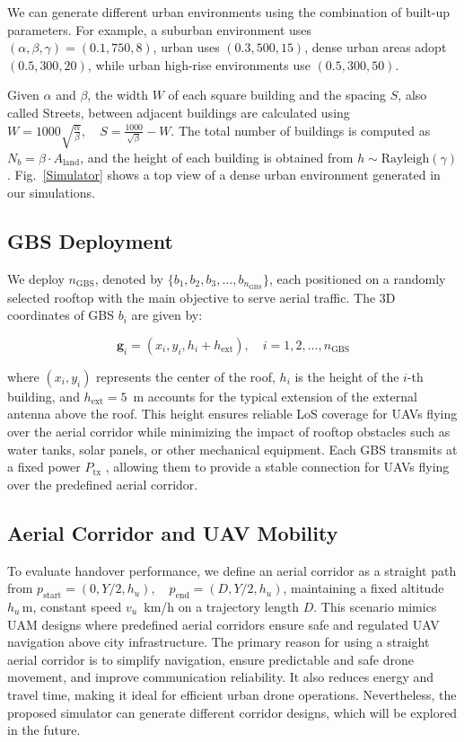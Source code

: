 \documentclass[10pt,conference]{IEEEtran}
\begin{document}
We can generate different urban environments using the combination of built-up parameters. For example, a suburban environment uses $(\alpha, \beta, \gamma) = (0.1, 750, 8)$, urban uses $(0.3, 500, 15)$, dense urban areas adopt $(0.5, 300, 20)$, while urban high-rise environments use $(0.5, 300, 50)$.

Given $\alpha$ and $\beta$, the width $W$ of each square building and the spacing $S$, also called Streets, between adjacent buildings are calculated using $W = 1000 \sqrt{\frac{\alpha}{\beta}}, \quad S = \frac{1000}{\sqrt{\beta}} - W$. The total number of buildings is computed as $N_b = \beta \cdot A_{\text{land}}$, and the height of each building is obtained from $h \sim \text{Rayleigh}(\gamma)$. Fig.~\ref{Simulator} shows a top view of a dense urban environment generated in our simulations.


\subsection{GBS Deployment}

We deploy $n_{\text{GBS}}$, denoted by $\{b_1, b_2, b_3, \dots, b_{n_{\text{GBS}}}\}$, each positioned on a randomly selected rooftop with the main objective to serve aerial traffic. The 3D coordinates of GBS $b_i$ are given by:

\begin{equation}
\mathbf{g}_i = (x_i, y_i, h_i + h_{\text{ext}}), \quad i = 1, 2, \dots, n_{\text{GBS}}
\end{equation}

where $(x_i, y_i)$ represents the center of the roof, $h_i$ is the height of the $i$-th building, and $h_{\text{ext}} = 5$~m accounts for the typical extension of the external antenna above the roof. This height ensures reliable LoS coverage for UAVs flying over the aerial corridor while minimizing the impact of rooftop obstacles such as water tanks, solar panels, or other mechanical equipment. Each GBS transmits at a fixed power $P_{\mathrm{tx}}$%
, allowing them to provide a stable connection for UAVs flying over the predefined aerial corridor.

\subsection{Aerial Corridor and UAV Mobility}

To evaluate handover performance, we define an aerial corridor as a straight path from $p_{\text{start}} = (0, Y/2, h_u), \quad p_{\text{end}} = (D, Y/2, h_u)$,
maintaining a fixed altitude $h_u\,$m, constant speed $v_u$~km/h on a trajectory length $D$. This scenario mimics UAM designs where predefined aerial corridors ensure safe and regulated UAV navigation above city infrastructure. The primary reason for using a straight aerial corridor is to simplify navigation, ensure predictable and safe drone movement, and improve communication reliability. It also reduces energy and travel time, making it ideal for efficient urban drone operations. Nevertheless, the proposed simulator can generate different corridor designs, which will be explored in the future.  
\end{document}
